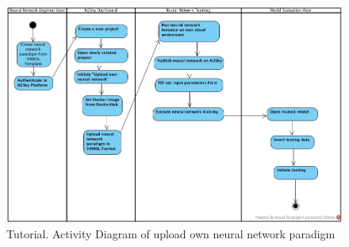 \begin{figure}[htbp]
\begin{center}
  \includegraphics[width=\linewidth]{components/tutorial/img/tutorial_contribut.jpg}
  \caption{Tutorial. Activity Diagram of upload own neural network paradigm}
  \label{fig:tutorial_contribut}
\end{center}
\end{figure} 



